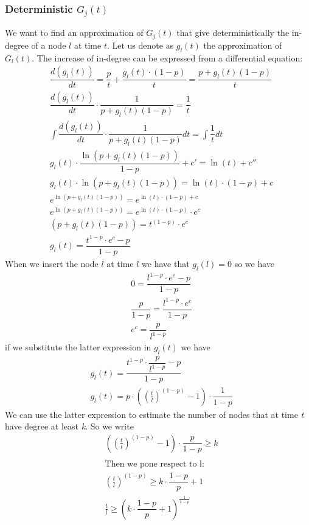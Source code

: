 \subsubsection{Deterministic $ G_j(t) $}
We want to find an approximation of $ G_j(t) $ that give deterministically the in-degree of a node $ l $ at time $ t $. Let us denote as $ g_l(t) $ the approximation of $ G_l(t) $. The increase of in-degree can be expressed from a differential equation:
\begin{align*}
	& \dfrac{d(g_l(t))}{dt} = \dfrac{p}{t} + \dfrac{ g_l(t) \cdot (1-p)}{t} = \dfrac{p + g_l(t) (1-p)}{t} \\
	& \dfrac{d(g_l(t))}{dt} \cdot \dfrac{1}{p + g_l(t) (1-p)} =  \dfrac{1}{t} \\
	& \int \dfrac{d(g_l(t))}{dt} \cdot \dfrac{1}{p + g_l(t) (1-p)} dt = \int   \dfrac{1}{t}  dt \\
	& g_l(t) \cdot \dfrac{\ln(p + g_l(t) (1-p))}{1-p} + c' = \ln(t) + c'' \\
	& g_l(t) \cdot  \ln(p + g_l(t) (1-p)) =  \ln(t) \cdot (1-p) + c \\
	& e^{\ln(p + g_l(t) (1-p))} = e^{\ln(t) \cdot (1-p) + c} \\
	&e^{\ln(p + g_l(t) (1-p))} = e^{\ln(t) \cdot (1-p) } \cdot e^c \\
	&(p + g_l(t) (1-p)) = t^{(1-p) } \cdot e^c \\
	& g_l(t) = \dfrac{t^{1-p} \cdot e^c - p}{1-p}	 
\end{align*}
When we insert the node $ l $ at time $ l $ we have that $ g_l(l) = 0  $ so we have
\begin{align*} 
 & 0= \dfrac{l^{1-p} \cdot e^c - p}{1-p}	 \\
 & \dfrac{p}{1-p} =\dfrac{l^{1-p} \cdot e^c}{1-p} \\
 &	e^c = \dfrac{p}{l^{1-p}}
\end{align*}
if we substitute the latter expression in $ g_l(t) $ we have
\begin{align*}
	 &g_l(t) = \dfrac{t^{1-p} \cdot \dfrac{p}{l^{1-p}} - p}{1-p}  \\
	 &g_l(t) = p \cdot \left( \left(\frac{t}{l}\right)^{(1-p)}  -1 \right) \cdot \dfrac{1}{1-p}
\end{align*}
\noindent
We can use the latter expression to estimate the number of nodes that at time \textit{t} have degree at least \textit{k}. So we write
\begin{align*}
	& \left( \left(\frac{t}{l}\right)^{(1-p)}  -1 \right) \cdot \dfrac{p}{1-p} \geq k \\\\
	&\text{Then we pone respect to l: } \\
	& \left(\frac{t}{l}\right)^{(1-p)} \geq k \cdot \dfrac{1-p}{p} + 1 \\
	& \frac{t}{l} \geq \left(k \cdot \dfrac{1-p}{p} + 1\right)^{\frac{1}{1-p}} 
	\end{align*}
